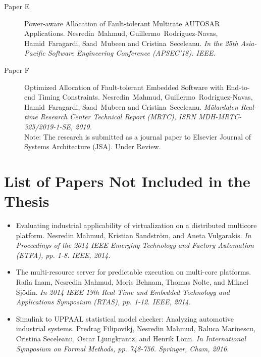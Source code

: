 {\begin{description}
   \item[Paper E] Power-aware Allocation of Fault-tolerant Multirate AUTOSAR Applications.
   Nesredin~Mahmud, Guillermo~Rodriguez-Navas, Hamid~Faragardi, Saad~Mubeen and Cristina~Seceleanu. \textit{In the 25th Asia-Pacific Software Engineering Conference (APSEC'18). IEEE.} \label{lbl_resa} \label{lbl_softwareallocation_ilp}
    \vspace{1cm}
	\item[Paper F] Optimized Allocation of Fault-tolerant Embedded Software with End-to-end Timing Constraints.	Nesredin~Mahmud, Guillermo~Rodriguez-Navas, Hamid~Faragardi, Saad~Mubeen and Cristina~Seceleanu. \textit{M\"{a}lardalen Real-time Research Center Technical Report (MRTC), ISRN MDH-MRTC-325/2019-1-SE, 2019.}\\
	{\footnotesize Note: The research is submitted as a journal paper to Elsevier Journal of Systems Architecture (JSA). Under Review}. \label{lbl_softwareallocation_pso}
  \end{description}
\section*{\Large List of Papers Not Included in the Thesis}
\vspace{1\baselineskip}
\begin{itemize}	
	\item Evaluating industrial applicability of virtualization on a distributed multicore platform. Nesredin Mahmud, Kristian Sandstr{\"o}m, and Aneta Vulgarakis. \textit{In Proceedings of the 2014 IEEE Emerging Technology and Factory Automation (ETFA), pp. 1-8. IEEE, 2014.}
	\item The multi-resource server for predictable execution on multi-core platforms. Rafia Inam, Nesredin Mahmud, Moris Behnam, Thomas Nolte, and Mikael Sj{\"o}din. \textit{In 2014 IEEE 19th Real-Time and Embedded Technology and Applications Symposium (RTAS), pp. 1-12. IEEE, 2014.}
	\item Simulink to UPPAAL statistical model checker: Analyzing automotive industrial systems. Predrag Filipovikj, Nesredin Mahmud, Raluca Marinescu, Cristina Seceleanu, Oscar Ljungkrantz, and Henrik L{\"o}nn. \textit{In International Symposium on Formal Methods, pp. 748-756. Springer, Cham, 2016.}
\end{itemize}

\vspace{1\baselineskip} }


